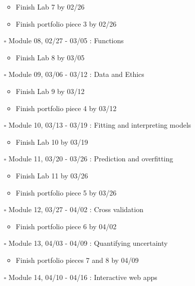 \documentclass[
]{article}
\providecommand{\tightlist}{%
  \setlength{\itemsep}{0pt}\setlength{\parskip}{0pt}}
\begin{document}
\begin{itemize}
  \begin{itemize}
  \tightlist
  \item
    Finish Lab 7 by 02/26
  \item
    Finish portfolio piece 3 by 02/26
  \end{itemize}
\item[$\square$]
  Module 08, 02/27 - 03/05 : Functions

  \begin{itemize}
  \tightlist
  \item
    Finish Lab 8 by 03/05
  \end{itemize}
\item[$\square$]
  Module 09, 03/06 - 03/12 : Data and Ethics

  \begin{itemize}
  \tightlist
  \item
    Finish Lab 9 by 03/12
  \item
    Finish portfolio piece 4 by 03/12
  \end{itemize}
\item[$\square$]
  Module 10, 03/13 - 03/19 : Fitting and interpreting models

  \begin{itemize}
  \tightlist
  \item
    Finish Lab 10 by 03/19
  \end{itemize}
\item[$\square$]
  Module 11, 03/20 - 03/26 : Prediction and overfitting

  \begin{itemize}
  \tightlist
  \item
    Finish Lab 11 by 03/26
  \item
    Finish portfolio piece 5 by 03/26
  \end{itemize}
\item[$\square$]
  Module 12, 03/27 - 04/02 : Cross validation

  \begin{itemize}
  \tightlist
  \item
    Finish portfolio piece 6 by 04/02
  \end{itemize}
\item[$\square$]
  Module 13, 04/03 - 04/09 : Quantifying uncertainty

  \begin{itemize}
  \tightlist
  \item
    Finish portfolio pieces 7 and 8 by 04/09
  \end{itemize}
\item[$\square$]
  Module 14, 04/10 - 04/16 : Interactive web apps


\end{itemize}
\end{document}
